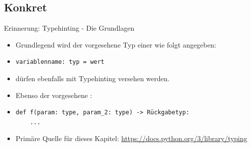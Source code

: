 \documentclass[12pt, aspectratio=169, usepdftitle=false]{beamer}
\begin{document}
\subsection{Konkret}
\begin{frame}[fragile]{Erinnerung: Typehinting - Die Grundlagen}
	\begin{itemize}
		\item Grundlegend wird der vorgesehene Typ einer  wie folgt angegeben:
		\item[]\begin{lstlisting}[language=pytiny]
variablenname: typ = wert
		\end{lstlisting}%
		
	\item {} dürfen ebenfalls mit Typehinting versehen werden. %
	\item[] Ebenso der vorgesehene :
	\item[]\begin{lstlisting}[language=pytiny]
def f(param: type, param_2: type) -> Rückgabetyp:
    ...
	\end{lstlisting} %
	
	\item Primäre Quelle für dieses Kapitel: \url{https://docs.python.org/3/library/typing}
	\end{itemize}
	

	
\end{frame}
\end{document}
